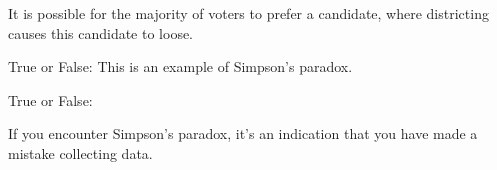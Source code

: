 \documentclass[nooutcomes,noauthor]{ximera}
\begin{document}
\begin{exercise}
  It is possible for the majority of voters to prefer a candidate,
  where districting causes this candidate to loose.

  
  True or False: This is an example of Simpson's paradox.

\end{exercise}




\begin{exercise}
  True or False:
  
  If you encounter Simpson's paradox, it's an indication that you have
  made a mistake collecting data.
 
\end{exercise}



\end{document}
